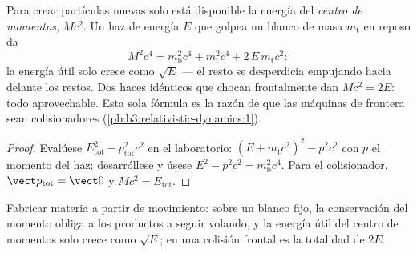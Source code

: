 \begin{proposition}\label{prop:b3:relativistic-dynamics:threshold}
Para crear partículas nuevas solo está disponible la energía del
\emph{centro de momentos}, $Mc^2$. Un haz de energía $E$ que golpea un
blanco de masa $m_{\text{t}}$ en reposo da
\[
M^2c^4 = m_{\text{b}}^2c^4 + m_{\text{t}}^2c^4 +
2\,E\,m_{\text{t}}c^2 :
\]
la energía útil solo crece como $\sqrt E$ --- el resto se desperdicia
empujando hacia delante los restos. Dos haces idénticos que chocan
frontalmente dan $Mc^2 = 2E$: todo aprovechable. Esta sola fórmula es la
razón de que las máquinas de frontera sean colisionadores
(\cref{pb:b3:relativistic-dynamics:1}).
\end{proposition}

\begin{proof}
Evalúese $E_{\text{tot}}^2 - p_{\text{tot}}^2c^2$ en el laboratorio:
$(E + m_{\text{t}}c^2)^2 - p^2c^2$ con $p$ el momento del haz; desarróllese
y úsese $E^2 - p^2c^2 = m_{\text{b}}^2c^4$. Para el colisionador,
$\vect p_{\text{tot}} = \vect 0$ y $Mc^2 = E_{\text{tot}}$.
\end{proof}

\begin{omfigure}

{\small Fabricar materia a partir de movimiento: sobre un blanco fijo, la
conservación del momento obliga a los productos a seguir volando, y la
energía útil del centro de momentos solo crece como $\sqrt E$; en una
colisión frontal es la totalidad de $2E$.}
\end{omfigure}

